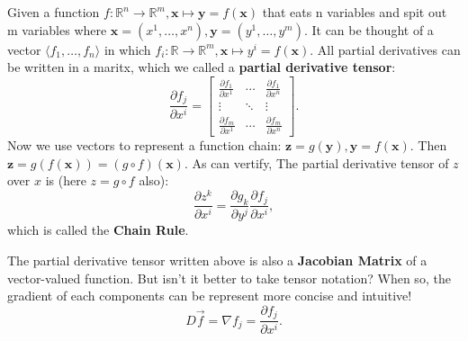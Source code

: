 \begin{theorem}
	Given a function $f: \mathbb{R}^n\to\mathbb{R}^m, \bm{x}\mapsto\mathbf{y}=f(\bm{x})$ that eats n variables and spit out m variables where $\bm{x}=(x^1,\dots,x^n), \mathbf{y}=(y^1,\dots,y^m)$.
	It can be thought of a vector $\langle f_1,\dots,f_n\rangle$ in which $f_i: \mathbb{R}\to\mathbb{R}^m, \bm{x}\mapsto y^i=f(\bm{x})$.
	All partial derivatives can be written in a maritx, which we called a \textbf{partial derivative tensor}:
	\[
		\frac{\partial f_j}{\partial x^i} = 
		\begin{bmatrix}
			\frac{\partial f_1}{\partial x^1} & \cdots & \frac{\partial f_1}{\partial x^n} \\
			\vdots & \ddots & \vdots \\
			\frac{\partial f_m}{\partial x^1} & \cdots & \frac{\partial f_m}{\partial x^n}
		\end{bmatrix}.
	\]
	Now we use vectors to represent a function chain: $\mathbf{z}=g(\mathbf{y}), \mathbf{y}=f(\bm{x})$. Then $\mathbf{z}=g(f(\bm{x}))=(g\circ f)(\bm{x})$. As can vertify,
	The partial derivative tensor of $z$ over $x$ is (here $z=g\circ f$ also):
	\begin{equation}
		\label{chain_rule}
		\frac{\partial z^k}{\partial x^i} = \frac{\partial g_k}{\partial y^j}\frac{\partial f_j}{\partial x^i},
	\end{equation}
	which is called the \textbf{Chain Rule}.
\end{theorem}

The partial derivative tensor written above is also a \textbf{Jacobian Matrix} of a vector-valued function. But isn't it better to take tensor notation?
When so, the gradient of each components can be represent more concise and intuitive!
\begin{equation}
	\label{jacobi_gradient}
	D\vec{f} = \nabla f_j = \frac{\partial f_j}{\partial x^i}.
\end{equation}

